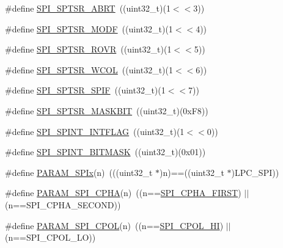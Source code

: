 \begin{DoxyCompactItemize}
\item 
\#define \hyperlink{group___s_p_i___private___macros_gaa6ce77ab27a3cfea533c38381c68dfc5}{\-S\-P\-I\-\_\-\-S\-P\-T\-S\-R\-\_\-\-A\-B\-R\-T}~((uint32\-\_\-t)(1$<$$<$3))
\item 
\#define \hyperlink{group___s_p_i___private___macros_ga8d673cfa305f5f811f2c0dbb98532a44}{\-S\-P\-I\-\_\-\-S\-P\-T\-S\-R\-\_\-\-M\-O\-D\-F}~((uint32\-\_\-t)(1$<$$<$4))
\item 
\#define \hyperlink{group___s_p_i___private___macros_gacb042b3e4aace8d208fdf39a83a7077e}{\-S\-P\-I\-\_\-\-S\-P\-T\-S\-R\-\_\-\-R\-O\-V\-R}~((uint32\-\_\-t)(1$<$$<$5))
\item 
\#define \hyperlink{group___s_p_i___private___macros_ga935f52864bfe86b53e04c89ed095a451}{\-S\-P\-I\-\_\-\-S\-P\-T\-S\-R\-\_\-\-W\-C\-O\-L}~((uint32\-\_\-t)(1$<$$<$6))
\item 
\#define \hyperlink{group___s_p_i___private___macros_ga392be5862f9189f6d6a39f2af8ae3db0}{\-S\-P\-I\-\_\-\-S\-P\-T\-S\-R\-\_\-\-S\-P\-I\-F}~((uint32\-\_\-t)(1$<$$<$7))
\item 
\#define \hyperlink{group___s_p_i___private___macros_gaf959c2746aff54b374dae105026b8b99}{\-S\-P\-I\-\_\-\-S\-P\-T\-S\-R\-\_\-\-M\-A\-S\-K\-B\-I\-T}~((uint32\-\_\-t)(0x\-F8))
\item 
\#define \hyperlink{group___s_p_i___private___macros_ga693ef3111a4fa25c360b5f597958de9b}{\-S\-P\-I\-\_\-\-S\-P\-I\-N\-T\-\_\-\-I\-N\-T\-F\-L\-A\-G}~((uint32\-\_\-t)(1$<$$<$0))
\item 
\#define \hyperlink{group___s_p_i___private___macros_gad58f195527f4c00f4285ab50d874c672}{\-S\-P\-I\-\_\-\-S\-P\-I\-N\-T\-\_\-\-B\-I\-T\-M\-A\-S\-K}~((uint32\-\_\-t)(0x01))
\item 
\#define \hyperlink{group___s_p_i___private___macros_ga26186e7c4449feb05206069084f36298}{\-P\-A\-R\-A\-M\-\_\-\-S\-P\-Ix}(n)~(((uint32\-\_\-t $\ast$)n)==((uint32\-\_\-t $\ast$)\-L\-P\-C\-\_\-\-S\-P\-I))
\item 
\#define \hyperlink{group___s_p_i___private___macros_ga09bf8576a8b0302efbaed9ed35c614de}{\-P\-A\-R\-A\-M\-\_\-\-S\-P\-I\-\_\-\-C\-P\-H\-A}(n)~((n==\hyperlink{group___s_p_i___public___macros_gab7c5fc382a31cde4a337edc1f71da83b}{\-S\-P\-I\-\_\-\-C\-P\-H\-A\-\_\-\-F\-I\-R\-S\-T}) $|$$|$ (n==\-S\-P\-I\-\_\-\-C\-P\-H\-A\-\_\-\-S\-E\-C\-O\-N\-D))
\item 
\#define \hyperlink{group___s_p_i___private___macros_ga6caa453876813e08a7df365c16f12584}{\-P\-A\-R\-A\-M\-\_\-\-S\-P\-I\-\_\-\-C\-P\-O\-L}(n)~((n==\hyperlink{group___s_p_i___public___macros_gacceaa0635df4917c6300093ed8d85ee4}{\-S\-P\-I\-\_\-\-C\-P\-O\-L\-\_\-\-H\-I}) $|$$|$ (n==\-S\-P\-I\-\_\-\-C\-P\-O\-L\-\_\-\-L\-O))

\end{DoxyCompactItemize}
